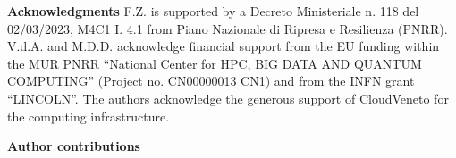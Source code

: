 \documentclass[10pt, aps, rmp,  twocolumn, superscriptaddress, floatfix, showkeys]{revtex4-2}
\begin{document}
\vspace{0.2 cm}

{\bf Acknowledgments}
F.Z. is supported by a Decreto Ministeriale n. 118 del 02/03/2023, M4C1 I. 4.1 from Piano Nazionale di Ripresa e Resilienza (PNRR). V.d.A. and M.D.D. acknowledge financial support from the EU funding within the MUR PNRR “National Center for HPC, BIG DATA AND QUANTUM COMPUTING” (Project no. CN00000013 CN1) and from the INFN grant “LINCOLN”. The authors acknowledge the generous support of CloudVeneto for the computing infrastructure.

\vspace{0.2 cm}
\vspace{0.2 cm}


{\bf Author contributions} 



\vspace{0.2 cm}



\renewcommand{\bibsection}{\section{References}}


\end{document}
